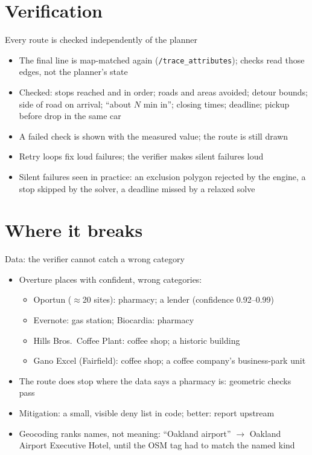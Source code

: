 \documentclass[aspectratio=169]{beamer}
\newcommand{\api}[1]{\texttt{#1}}
\begin{document}
\section{Verification}

\begin{frame}{Every route is checked independently of the planner}
  \begin{itemize}
    \item The final line is map-matched again (\api{/trace\_attributes}); checks read those edges, not the planner's state
    \item Checked: stops reached and in order; roads and areas avoided; detour bounds; side of road on arrival; ``about $N$ min in''; closing times; deadline; pickup before drop in the same car
    \item A failed check is shown with the measured value; the route is still drawn
    \item Retry loops fix loud failures; the verifier makes silent failures loud
    \item Silent failures seen in practice: an exclusion polygon rejected by the engine, a stop skipped by the solver, a deadline missed by a relaxed solve
  \end{itemize}
\end{frame}

\section{Where it breaks}

\begin{frame}{Data: the verifier cannot catch a wrong category}
  \begin{itemize}
    \item Overture places with confident, wrong categories:
      \begin{itemize}
        \item Oportun ($\approx$20 sites): pharmacy; a lender (confidence 0.92--0.99)
        \item Evernote: gas station; Biocardia: pharmacy
        \item Hills Bros.\ Coffee Plant: coffee shop; a historic building
        \item Gano Excel (Fairfield): coffee shop; a coffee company's business-park unit
      \end{itemize}
    \item The route does stop where the data says a pharmacy is: geometric checks pass
    \item Mitigation: a small, visible deny list in code; better: report upstream
    \item Geocoding ranks names, not meaning: ``Oakland airport'' $\to$ Oakland Airport Executive Hotel, until the OSM tag had to match the named kind
  \end{itemize}
\end{frame}
\end{document}
